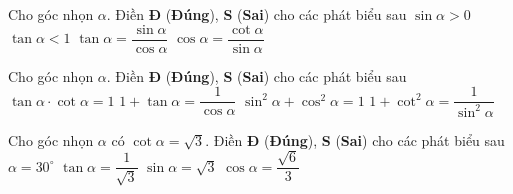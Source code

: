 \begin{ex}%
	Cho góc nhọn $\alpha$. Điền \textbf{Đ} (\textbf{Đúng}), \textbf{S} (\textbf{Sai}) cho các phát biểu sau
	\choiceTF
	{\True $\sin \alpha > 0$}
	{$\tan \alpha < 1$}
	{\True $\tan \alpha = \dfrac{\sin \alpha}{\cos \alpha}$}
	{$\cos \alpha = \dfrac{\cot \alpha}{\sin \alpha}$}
	\loigiai{
	}
\end{ex}
\begin{ex}%
%
Cho góc nhọn $\alpha$. Điền \textbf{Đ} (\textbf{Đúng}), \textbf{S} (\textbf{Sai}) cho các phát biểu sau
\choiceTF
{\True $\tan \alpha \cdot \cot \alpha = 1$}
{$1 + \tan \alpha = \dfrac{1}{\cos \alpha}$}
{\True $\sin^2 \alpha + \cos^2 \alpha = 1$}
{\True $1 + \cot^2 \alpha = \dfrac{1}{\sin^2 \alpha}$}
\loigiai{
}
\end{ex}
\begin{ex}%
	Cho góc nhọn $\alpha$ có $\cot \alpha = \sqrt{3}$. Điền \textbf{Đ} (\textbf{Đúng}), \textbf{S} (\textbf{Sai}) cho các phát biểu sau
	\choiceTF
	{\True $\alpha = 30^\circ$}
	{\True $\tan \alpha = \dfrac{1}{\sqrt{3}}$}
	{$\sin \alpha = \sqrt{3}$}
	{$\cos \alpha = \dfrac{\sqrt{6}}{3}$}
\end{ex}
